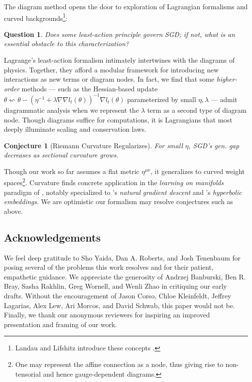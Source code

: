 \documentclass{article}
\theoremstyle{plain}
\newtheorem{conj}{Conjecture}
\newtheorem{quest}{Question}
\theoremstyle{definition}
\begin{document}
        The diagram method opens the door to exploration of Lagrangian
        formalisms and curved backgrounds\footnote{
            Landau and Lifshitz introduce these concepts
            .
        }:
        \begin{quest}
            Does some least-action principle govern SGD; if not, what is an
            essential obstacle to this characterization?
        \end{quest}
        Lagrange's least-action formalism intimately intertwines with the
        diagrams of physics.  Together, they afford a modular framework for
        introducing new interactions as new terms or diagram nodes.  In fact,
        we find that some \emph{higher-order} methods --- such as the
        Hessian-based update
        $
            \theta \leftsquigarrow
            \theta -
            (\eta^{-1} + \lambda \nabla \nabla l_t(\theta))^{-1}
            \nabla l_t(\theta)
        $
        parameterized by small $\eta, \lambda$ --- admit diagrammatic analysis
        when we represent the $\lambda$ term as a second type of diagram node.
        Though diagrams suffice for computations, it is Lagrangians that most
        deeply illuminate scaling and conservation laws.
        \begin{conj}[Riemann Curvature Regularizes]
            For small $\eta$, SGD's gen. gap decreases as sectional curvature
            grows.
        \end{conj}
        Though our work so far assumes a flat metric $\eta^{\mu\nu}$, it
        generalizes to curved weight spaces\footnote{
            One may represent the affine connection as a node, thus giving
            rise to non-tensorial and hence gauge-dependent diagrams.
        }.
        Curvature finds concrete application in the \emph{learning on
        manifolds} paradigm of \citet{ab07, zh16}, notably specialized to
        \citet{am98}'s \emph{natural gradient descent} and \citet{ni17}'s
        \emph{hyperbolic embeddings}.  We are optimistic our formalism may
        resolve conjectures such as above.


\subsection{Acknowledgements}
    We feel deep gratitude to
        Sho Yaida,
        Dan A. Roberts, and
        Josh Tenenbaum
    for posing several of the problems this work resolves and for their
    patient, empathetic guidance.  We appreciate the generosity of
        Andrzej Banburski,
        Ben R. Bray,
        Sasha Rakhlin,
        Greg Wornell, and
        Wenli Zhao
    in critiquing our early drafts.
    Without the encouragement of
        Jason Corso,
        Chloe Kleinfeldt,
        Jeffrey Lagarias,
        Alex Lew, 
        Ari Morcos, and
        David Schwab,
    this paper would not be.
    Finally, we thank our anonymous reviewers for inspiring an improved
    presentation and framing of our work.
\end{document}
